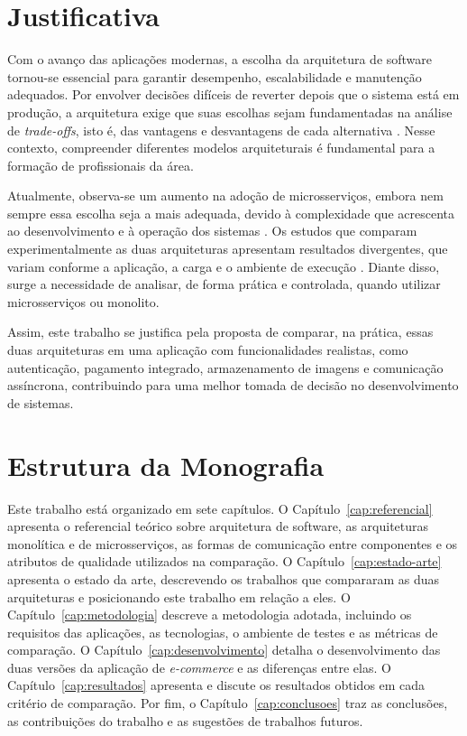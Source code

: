 \section{Justificativa}

Com o avanço das aplicações modernas, a escolha da arquitetura de software tornou-se essencial
para garantir desempenho, escalabilidade e manutenção adequados. Por envolver decisões
difíceis de reverter depois que o sistema está em produção, a arquitetura exige que suas
escolhas sejam fundamentadas na análise de \textit{trade-offs}, isto é, das vantagens e
desvantagens de cada alternativa \cite{richards2024}. Nesse contexto, compreender diferentes
modelos arquiteturais é fundamental para a formação de profissionais da área.

Atualmente, observa-se um aumento na adoção de microsserviços, embora nem sempre essa escolha
seja a mais adequada, devido à complexidade que acrescenta ao desenvolvimento e à operação dos
sistemas \cite{newman2021, aws-monolito-microsservicos}. Os estudos que comparam
experimentalmente as duas arquiteturas apresentam resultados divergentes, que variam conforme
a aplicação, a carga e o ambiente de execução \cite{aldebagy2018, blinowski2022}. Diante disso,
surge a necessidade de analisar, de forma prática e controlada, quando utilizar microsserviços
ou monolito.

Assim, este trabalho se justifica pela proposta de comparar, na prática, essas duas
arquiteturas em uma aplicação com funcionalidades realistas, como autenticação, pagamento
integrado, armazenamento de imagens e comunicação assíncrona, contribuindo para uma melhor
tomada de decisão no desenvolvimento de sistemas.

\section{Estrutura da Monografia}

Este trabalho está organizado em sete capítulos. O Capítulo~\ref{cap:referencial} apresenta o
referencial teórico sobre arquitetura de software, as arquiteturas monolítica e de
microsserviços, as formas de comunicação entre componentes e os atributos de qualidade
utilizados na comparação. O Capítulo~\ref{cap:estado-arte} apresenta o estado da arte, descrevendo
os trabalhos que compararam as duas arquiteturas e posicionando este trabalho em relação a
eles. O Capítulo~\ref{cap:metodologia}
descreve a metodologia adotada, incluindo os requisitos das aplicações, as tecnologias, o
ambiente de testes e as métricas de comparação. O Capítulo~\ref{cap:desenvolvimento} detalha o
desenvolvimento das duas versões da aplicação de \textit{e-commerce} e as diferenças entre
elas. O Capítulo~\ref{cap:resultados} apresenta e discute os resultados obtidos em cada
critério de comparação. Por fim, o Capítulo~\ref{cap:conclusoes} traz as conclusões, as
contribuições do trabalho e as sugestões de trabalhos futuros.
